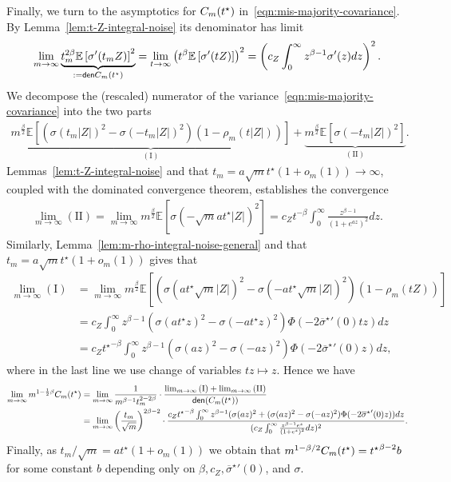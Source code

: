 \documentclass[11pt]{article}
\newcommand{\Ep}{\mathbb{E}}
\newcommand{\prn}[1]{\left({#1}\right)} %
\newcommand{\prns}[1]{({#1})} %
\newcommand{\wb}[1]{\overline{#1}}
\newcommand{\<}{\langle} %
\renewcommand{\>}{\rangle}
\newcommand{\opt}{^\star}
\begin{document}
Finally, we turn to the asymptotics for $\varfunc(t\opt)$
in~\eqref{eqn:mis-majority-covariance}.
By Lemma~\ref{lem:t-Z-integral-noise}
its denominator has limit
\begin{align*}
  \lim_{m \to \infty}
  \underbrace{t_m^{2 \beta} \Ep\left[\sigma'(t_m Z)\right]^2}_{:=
    \mathsf{den}{\varfunc(t\opt)}}
  = \lim_{t \to \infty}
  \left(t^\beta \Ep\left[\sigma'(t Z)\right]\right)^2
  = \left(c_Z\int_{0}^\infty z^{\beta - 1} \sigma'(z)dz\right)^2.  
\end{align*}
We decompose the (rescaled) numerator of the
variance~\eqref{eqn:mis-majority-covariance} into the two parts
\begin{align*}
  \underbrace{m^{\frac{\beta}{2}} \Ep \left[\left(
      \sigma(t_m|Z|)^2 - \sigma(-t_m |Z|)^2\right)
      (1-\rho_m(t|Z|)) \right]}_{\mathrm{(I)}}
  + \underbrace{m^{\frac{\beta}{2}} \Ep \left[\sigma(-t_m|Z|)^2\right]}_{
    \mathrm{(II)}}.
\end{align*}
Lemmas~\ref{lem:t-Z-integral-noise} and that $t_m = a \sqrt{m} t\opt(1 +
o_m(1)) \to \infty$, coupled with the dominated
convergence theorem, establishes the convergence
\begin{align*}
  \lim_{m \to \infty}  \mathrm{(II)} = \lim_{m \to \infty} m^{\frac \beta 2}
  \Ep \left[\sigma(-\sqrt{m} a t\opt |Z|)^2\right]
  = c_Z {t}^{-\beta} \int_0^\infty \frac{z^{\beta - 1}}{\left(1 + e^{a z}\right)^2}
  dz.
\end{align*}
Similarly,
Lemma~\ref{lem:m-rho-integral-noise-general} and that
$t_m = a \sqrt{m} t\opt(1 + o_m(1))$
gives that
\begin{align*}
  \lim_{m \to \infty} \mathrm{(I)} 
  & = \lim_{m \to \infty} m^{\frac \beta 2} \Ep \left[
    \left(\sigma(at\opt \sqrt{m}|Z|)^2 - \sigma(-a t\opt\sqrt{m}|Z|)^2
    \right) (1 - \rho_m(t Z)) \right] \\
  & = c_Z \int_0^\infty z^{\beta - 1}
  \left(\sigma(a t\opt z)^2 - \sigma(-at\opt z)^2\right)
  \Phi \left(-2{\wb{\sigma}\opt}'(0) t z\right) dz \\
  & = c_Z {t\opt}^{-\beta} \int_0^\infty z^{\beta - 1}
  \left(\sigma(az)^2 - \sigma(-az)^2\right)
  \Phi \left(-2{\wb{\sigma}\opt}'(0) z\right) dz,
\end{align*}
where in the last line we use change of variables $tz \mapsto z$. Hence we have
\begin{align*}
  \lim_{m\to \infty} m^{1 - \frac{1}{2} \beta} \varfunc(t\opt)
  & = \lim_{m \to \infty} \frac{1}{m^{\beta - 1} t_m^{2 - 2 \beta}}
  \cdot \frac{\lim_{m\to \infty}\mathrm{(I)} + \lim_{m\to \infty}\mathrm{(II)}}{
    \mathsf{den}(C_m(t\opt))} \\
  & =  \lim_{m\to \infty} \prn{\frac{t_m}{\sqrt m}}^{2\beta - 2}
  \cdot \frac{c_Z {t\opt}^{-\beta} \int_0^\infty z^{\beta - 1}
    \prns{\sigma(az)^2
      + (\sigma(az)^2 - \sigma(-az)^2) \Phi(-2{\wb{\sigma}\opt}'(0) z)}
    dz}{
    (c_Z\int_{0}^\infty \frac{z^{\beta - 1} e^{z} }{ (1 + e^{z})^2} dz)^2}.
\end{align*}
Finally, as $t_m / \sqrt{m} = a t\opt (1 + o_m(1))$ we obtain that
$m^{1 - \beta/2} \varfunc(t\opt) = {t\opt}^{\beta - 2} b$ for
some constant $b$ depending only on $\beta, c_Z, {\wb{\sigma}\opt}'(0)$,
and $\sigma$.
\end{document}
